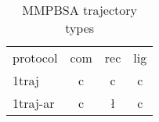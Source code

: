 \documentclass{article}
\begin{document}
  
\begin{table}
  
  \centering
  \begin{tabular}{lccc}
    protocol & com & rec & lig \\
    1traj    & c   & c   & c   \\
    1traj-ar & c   & \l \g  & c   \\

    
  \end{tabular}
  
  \caption{MMPBSA trajectory types}
  \label{}
  
\end{table}
  
\end{document}
